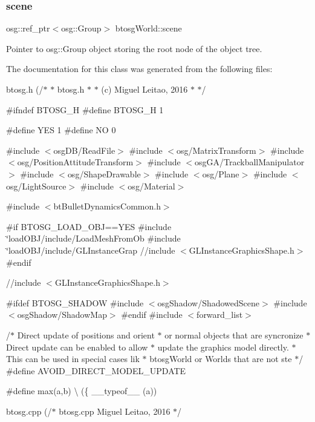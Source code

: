 \subsubsection{\texorpdfstring{scene}{scene}}
{\footnotesize\ttfamily osg\+::ref\+\_\+ptr$<$osg\+::\+Group$>$ btosg\+World\+::scene}



Pointer to osg\+::\+Group object storing the root node of the object tree. 



The documentation for this class was generated from the following files\+:\begin{DoxyCompactItemize}
\item 
btosg.\+h (/$\ast$
 $\ast$	btosg.\+h
 $\ast$
 $\ast$	(c) Miguel Leitao, 2016
 $\ast$
 $\ast$/

\#ifndef B\+T\+O\+S\+G\+\_\+\+H
\#define B\+T\+O\+S\+G\+\_\+\+H 1

\#define Y\+E\+S 1
\#define N\+O  0

\#include $<$osg\+D\+B/\+Read\+File$>$
\#include $<$osg/\+Matrix\+Transform$>$
\#include $<$osg/\+Position\+Attitude\+Transform$>$
\#include $<$osg\+G\+A/\+Trackball\+Manipulator$>$
\#include $<$osg/\+Shape\+Drawable$>$
\#include $<$osg/\+Plane$>$
\#include $<$osg/\+Light\+Source$>$
\#include $<$osg/\+Material$>$

\#include $<$bt\+Bullet\+Dynamics\+Common.\+h$>$

\#if B\+T\+O\+S\+G\+\_\+\+L\+O\+A\+D\+\_\+\+O\+B\+J==\+Y\+E\+S
\#include \char`\"{}load\+O\+B\+J/include/\+Load\+Mesh\+From\+Ob
\#include \char`\"{}load\+O\+B\+J/include/\+G\+L\+Instance\+Grap
//include $<$\+G\+L\+Instance\+Graphics\+Shape.\+h$>$
\#endif

//include $<$\+G\+L\+Instance\+Graphics\+Shape.\+h$>$

\#ifdef B\+T\+O\+S\+G\+\_\+\+S\+H\+A\+D\+O\+W
\#include $<$osg\+Shadow/\+Shadowed\+Scene$>$
\#include $<$osg\+Shadow/\+Shadow\+Map$>$
\#endif
\#include $<$forward\+\_\+list$>$

/$\ast$ Direct update of positions and orient
 $\ast$ or normal objects that are syncronize
 $\ast$ Direct update can be enabled to allow
 $\ast$ update the graphics model directly.
 $\ast$ This can be used in special cases lik
 $\ast$ btosg\+World or Worlds that are not ste
 $\ast$/
\#define A\+V\+O\+I\+D\+\_\+\+D\+I\+R\+E\+C\+T\+\_\+\+M\+O\+D\+E\+L\+\_\+\+U\+P\+D\+A\+T\+E

\#define max(a,b) \textbackslash{}
   (\{ \+\_\+\+\_\+typeof\+\_\+\+\_\+ (a))\item 
btosg.\+cpp (/$\ast$
	btosg.\+cpp
	\+Miguel Leitao, 2016
$\ast$/


\end{DoxyCompactItemize}
